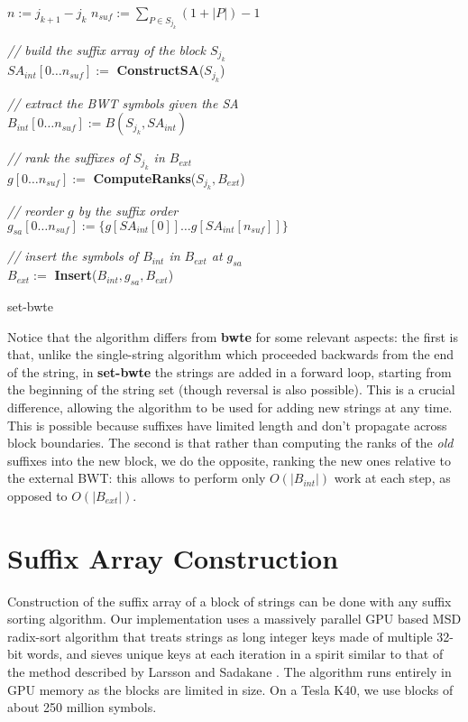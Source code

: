 \documentclass{acmsiggraph}
\begin{document}
\begin{algorithm}
 {
  $n          := j_{k+1} - j_k$\;
  $n_{suf} := \sum_{P \in S_{j_k}}{(1 + |P|)}-1$\;

  \emph{// build the suffix array of the block $S_{j_k}$ }\\
  $SA_{int}[0 \dots n_{suf}] :=$ {\bf ConstructSA}($S_{j_k}$)\;
  
  \emph{// extract the BWT symbols given the SA }\\
  $B_{int}[0 \dots n_{suf}] := B(S_{j_k}, SA_{int})$\;

  \emph{// rank the suffixes of $S_{j_k}$ in $B_{ext}$ }\\
  $g[0 \dots n_{suf}] :=$ {\bf ComputeRanks}($S_{j_k}, B_{ext}$)\;
  
  \emph{// reorder $g$ by the suffix order }\\
$g_{sa}[0 \dots n_{suf}] := \{ g[SA_{int}[0]] \dots g[SA_{int}[n_{suf}]]\}$

  \emph{// insert the symbols of $B_{int}$ in $B_{ext}$ at $g_{sa}$ }\\
  $B_{ext} := $ {\bf Insert}($B_{int}, g_{sa}, B_{ext}$)\;
}
\caption{set-bwte}
\end{algorithm}

Notice that the algorithm differs from {\bf bwte} for some relevant aspects: the first is that, unlike the single-string algorithm which proceeded backwards
from the end of the string, in {\bf set-bwte} the strings are added in a forward loop, starting from the beginning of the string set (though reversal is also possible).
This is a crucial difference, allowing the algorithm to be used for adding new strings at any time. This is possible because suffixes have limited length and
don't propagate across block boundaries.
The second is that rather than computing the ranks of the \emph{old} suffixes into the new block, we do the opposite, ranking the new ones relative to the external
BWT: this allows to perform only $O(|B_{int}|)$ work at each step, as opposed to $O(|B_{ext}|)$. 

\section{Suffix Array Construction}

Construction of the suffix array of a block of strings can be done with any suffix sorting algorithm.
Our implementation uses a massively parallel GPU based MSD radix-sort algorithm that treats strings as long integer keys made of multiple 32-bit words,
and sieves unique keys at each iteration in a spirit similar to that of the method described by Larsson and Sadakane .
The algorithm runs entirely in GPU memory as the blocks are limited in size.
On a Tesla K40, we use blocks of about 250 million symbols.
\end{document}
